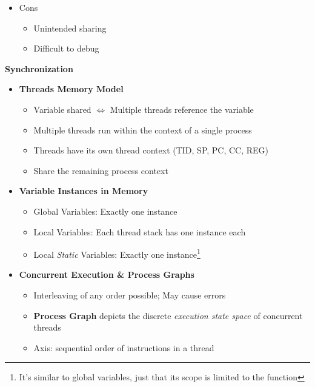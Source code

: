 \documentclass[12pt]{article}
\newcommand{\cname}[1]{\large \textbf{#1}}
\begin{document}
{\begin{itemize}
\begin{itemize}
				\begin{itemize}
					\item Easy to share data between threads (perhaps too easy)
					\item Efficient than processes (cheaper context switch)
				\end{itemize}
				\item Cons
				\begin{itemize}
					\item Unintended sharing
					\item Difficult to debug
				\end{itemize}
			\end{itemize}
		\end{itemize}
		\pagebreak
		
		\cname{Synchronization}
		\begin{itemize}
			\item \textbf{Threads Memory Model}
			\begin{itemize}
				\item Variable shared $\iff$ Multiple threads reference the variable
				\item Multiple threads run within the context of a single process
				\item Threads have its own thread context (TID, SP, PC, CC, REG)
				\item Share the remaining process context
			\end{itemize}
			\item \textbf{Variable Instances in Memory}
			\begin{itemize}
				\item Global Variables: Exactly one instance
				\item Local Variables: Each thread stack has one instance each
				\item Local \textit{Static} Variables: Exactly one instance\footnote{It's similar to global variables, just that its scope is limited to the function}
			\end{itemize}
			\item \textbf{Concurrent Execution \& Process Graphs}
			\begin{itemize}
				\item Interleaving of any order possible; May cause errors
				\item \textbf{Process Graph} depicts the discrete \textit{execution state space} of concurrent threads
				\item Axis: sequential order of instructions in a thread

\end{itemize}
\end{itemize}}
\end{document}
